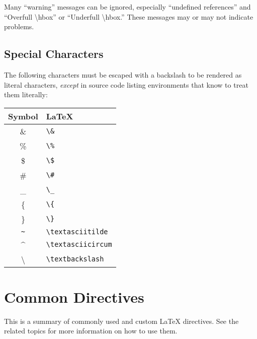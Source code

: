 Many ``warning'' messages can be ignored, especially ``undefined references'' and ``Overfull {\textbackslash}hbox'' or ``Underfull {\textbackslash}hbox.'' These messages may or may not indicate problems.

\begin{samepage}
\section{Special Characters}

The following characters must be escaped with a backslash to be rendered as literal characters, \emph{except} in source code listing environments that know to treat them literally:

\begin{center}
\begin{tabular}{|c|l|}
\hline
\textbf{Symbol} & \textbf{LaTeX} \\
\hline
\& & \verb|\&| \\
\% & \verb|\%| \\
\$ & \verb|\$| \\
\# & \verb|\#| \\
\_ & \verb|\_| \\
\{ & \verb|\{| \\
\} & \verb|\}| \\
\texttt{\textasciitilde} & \verb|\textasciitilde| \\
\textasciicircum & \verb|\textasciicircum| \\
\textbackslash & \verb|\textbackslash| \\
\hline
\end{tabular}
\end{center}
\end{samepage}

\section{Common Directives}

This is a summary of commonly used and custom LaTeX directives. See the related topics for more information on how to use them.

